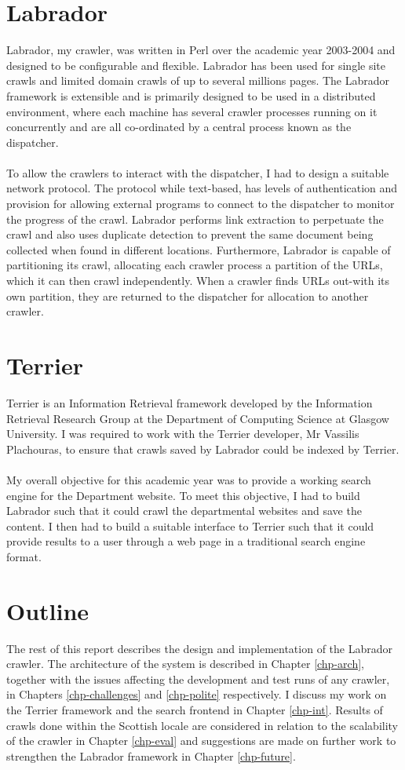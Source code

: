 \section{Labrador}
Labrador, my crawler, was written in Perl over the academic year 2003-2004 and designed to be configurable and flexible. Labrador has been used for single site crawls and limited domain crawls of up to several millions pages. The Labrador framework is extensible and is primarily designed to be used in a distributed environment, where each machine has several crawler processes running on it concurrently and are all co-ordinated by a central process known as the dispatcher.\\
\ \\
To allow the crawlers to interact with the dispatcher, I had to design a suitable network protocol. The protocol while text-based, has levels of authentication and provision for allowing external programs to connect to the dispatcher to monitor the progress of the crawl. Labrador performs link extraction to perpetuate the crawl and also uses duplicate detection to prevent the same document being collected when found in different locations. Furthermore, Labrador is capable of partitioning its crawl, allocating each crawler process a partition of the URLs, which it can then crawl independently. When a crawler finds URLs out-with its own partition, they are returned to the dispatcher for allocation to another crawler.\\
\section{Terrier}
Terrier is an Information Retrieval framework developed by the Information Retrieval Research Group at the Department of Computing Science at Glasgow University. I was required to work with the Terrier developer, Mr Vassilis Plachouras, to ensure that crawls saved by Labrador could be indexed by Terrier.\\
\ \\
My overall objective for this academic year was to provide a working search engine for the Department website. To meet this objective, I had to build Labrador such that it could crawl the departmental websites and save the content. I then had to build a suitable interface to Terrier such that it could provide results to a user through a web page in a traditional search engine format.

\section{Outline}
The rest of this report describes the design and implementation of the Labrador crawler. The architecture of the system is described in Chapter \ref{chp-arch}, together with the issues affecting the development and test runs of any crawler, in Chapters \ref{chp-challenges} and \ref{chp-polite} respectively. I discuss my work on the Terrier framework and the search frontend in Chapter \ref{chp-int}. Results of crawls done within the Scottish locale are considered in relation to the scalability of the crawler in Chapter \ref{chp-eval} and suggestions are made on further work to strengthen the Labrador framework in Chapter \ref{chp-future}.

